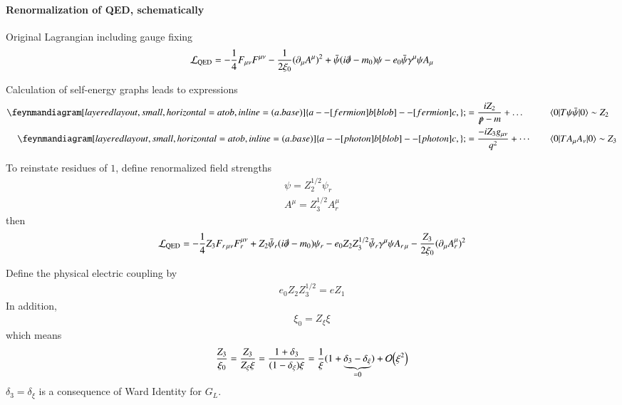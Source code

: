 \paragraph{Renormalization of QED, schematically}
Original Lagrangian including gauge fixing
\begin{align}
   \mathcal{L}_{\text{QED}} = - \frac{1}{4} F_{\mu\nu}F^{\mu\nu} - \frac{1}{2\xi_0}  (\partial_\mu A^\mu)^2 + \bar \psi (i \slashed{\partial} - m_0) \psi - e_0 \bar\psi \gamma^\mu \psi A_\mu
\end{align}

Calculation of self-energy graphs leads to expressions 
\begin{align*}
   \feynmandiagram[layered layout, small, horizontal=a to b, inline=(a.base)]{a --[fermion] b[blob] --[fermion] c,}; &= \frac{iZ_2}{\slashed{p}- m} + \dots  \quad
                                                                                                                     && \braket{0 | T \psi \bar\psi | 0} \sim Z_2 \\
   \feynmandiagram[layered layout, small, horizontal=a to b, inline=(a.base)]{a --[photon] b[blob] --[photon] c,}; &= \frac{-iZ_3 g_{\mu\nu}}{q^2} + \cdots  \quad
                                                                                                                   &&  \braket{0 | T A_\mu A_\nu | 0} \sim Z_3 
\end{align*}

To reinstate residues of $1$, define renormalized field strengths 
\begin{align}
   \psi = Z_2^{1/2} \psi_r \\
   A^\mu = Z_3^{1/2} A^\mu_r 
\end{align}
then 
\begin{align}
   \mathcal{L}_\text{QED} = - \frac{1}{4} Z_3 F_{r \, \mu\nu}F_r^{\mu\nu} + Z_2 \bar\psi_r (i \slashed{\partial} - m_0)\psi_r - e_0 Z_2 Z_3^{1/2} \bar\psi_r \gamma^\mu \psi A_{r\, \mu} - \frac{Z_3}{2\xi_0} (\partial_\mu A_r^\mu)^2
\end{align}

Define the physical electric coupling by 
\begin{align}
  e_0 Z_2 Z_3^{1/2} = e Z_1 
\end{align}
In addition, 
\begin{align}
  \xi_0 = Z_\xi \xi 
\end{align}
which means 
\begin{align*}
  \frac{Z_3}{\xi_0} = \frac{Z_3}{Z_\xi \xi} = \frac{1+\delta_3}{(1-\delta_\xi)\xi} = \frac{1}{\xi} (1+ \underbrace{\delta_3 - \delta_\xi}_{=0}) + \order{\xi^2} 
\end{align*}
$\delta_3 = \delta_\xi$ is a consequence of Ward Identity for $G_L$.


